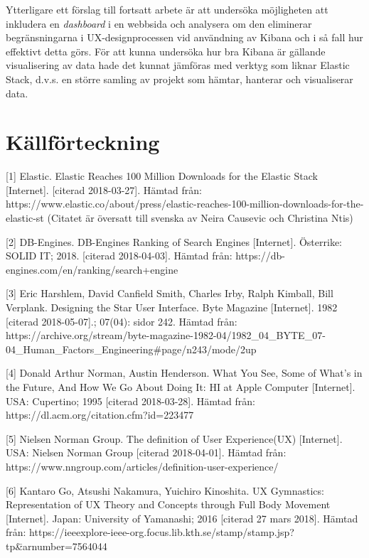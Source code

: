 \documentclass[12pt]{kththesis}
\begin{document}
Ytterligare ett förslag till fortsatt arbete är att undersöka möjligheten att inkludera en \textit{dashboard} i en webbsida och analysera om den eliminerar begränsningarna i UX-designprocessen vid användning av Kibana och i så fall hur effektivt detta görs. För att kunna undersöka hur bra Kibana är gällande visualisering av data hade det kunnat jämföras med verktyg som liknar Elastic Stack, d.v.s. en större samling av projekt som hämtar, hanterar och visualiserar data. 

\afterpage{\null\newpage}

\chapter{Källförteckning}
[1] Elastic. Elastic Reaches 100 Million Downloads for the Elastic Stack [Internet]. [citerad 2018-03-27]. Hämtad från: https://www.elastic.co/about/press\newline/elastic-reaches-100-million-downloads-for-the-elastic-st (Citatet är översatt till svenska av Neira Causevic och Christina Ntis)

[2] DB-Engines. DB-Engines Ranking of Search Engines [Internet]. Österrike: SOLID IT; 2018. [citerad 2018-04-03]. Hämtad från:\newline  
https://db-engines.com/en/ranking/search+engine  

[3] Eric Harshlem, David Canfield Smith, Charles Irby, Ralph Kimball, Bill Verplank. Designing the Star User Interface. Byte Magazine [Internet]. 1982  [citerad 2018-05-07].; 07(04): sidor 242. Hämtad från: \newline https://archive.org/stream/byte-magazine-1982-04/1982\_04\_BYTE\_07-04\newline\_Human\_Factors\_Engineering\#page/n243/mode/2up    
   
[4] Donald Arthur Norman, Austin Henderson. What You See, Some of What's in the Future, And How We Go About Doing It: HI at Apple Computer [Internet]. USA: Cupertino; 1995 [citerad 2018-03-28]. Hämtad från: https://dl.acm.org/citation.cfm?id=223477

[5] Nielsen Norman Group. The definition of User Experience(UX) [Internet]. USA: Nielsen Norman Group [citerad 2018-04-01]. Hämtad från:  https://www.nngroup.com/articles/definition-user-experience/        
                           
[6] Kantaro Go, Atsushi Nakamura, Yuichiro Kinoshita. UX Gymnastics: Representation of UX Theory and Concepts through Full Body Movement [Internet].  Japan: University of Yamanashi; 2016 [citerad 27 mars 2018]. Hämtad från: https://ieeexplore-ieee-org.focus.lib.kth.se\newline/stamp/stamp.jsp?tp\=\&arnumber=7564044
                                           
\end{document}

